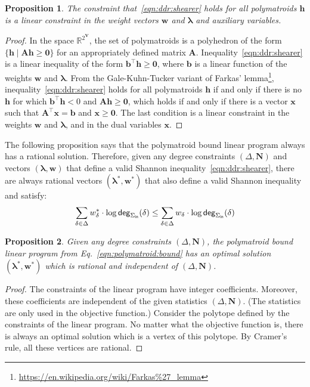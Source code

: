 \documentclass[10pt,a4paper]{article}
\newtheorem{proposition}{Proposition}[section]
\newcommand{\degree}{\text{\sf deg}}
\newcommand{\R}{\mathbb R} %
\newcommand{\inn}{\text{\sf in}}
\begin{document}
\begin{proposition}
The constraint that~\eqref{eqn:ddr:shearer} holds for all polymatroids $\bm h$ is a linear constraint in the
weight vectors $\bm w$ and $\bm \lambda$ and auxiliary variables.
\end{proposition}
\begin{proof}
  In the space $\R^{2^{\bm V}}$, the set of polymatroids is a polyhedron of the form
  $\{ \bm h \mid \bm A \bm h \geq \bm 0 \}$ for an appropriately defined matrix $\bm A$.
  Inequality~\eqref{eqn:ddr:shearer} is a linear inequality of the form
  $\bm b^\top \bm h \geq \bm 0$, where $\bm b$ is a linear function of the weights $\bm w$ and $\bm \lambda$.
  From the Gale-Kuhn-Tucker variant of Farkas' lemma\footnote{\url{https://en.wikipedia.org/wiki/Farkas\%27_lemma}},
  inequality~\eqref{eqn:ddr:shearer} holds for all polymatroids $\bm h$ if and only if
  there is no $\bm h$ for which $\bm b^\top \bm h < 0$ and $\bm A\bm h \geq \bm 0$,
  which holds if and only if there is a vector $\bm x$ such that
  $\bm A^\top \bm x = \bm b$ and $\bm x \geq \bm 0$.
  The last condition is a linear constraint in the weights $\bm w$ and $\bm \lambda$, and
  in the dual variables $\bm x$.
\end{proof}

    The following proposition says that the polymatroid bound linear program always has a rational solution.
    Therefore, given any degree constraints $(\Delta, \bm N)$ and vectors $(\bm\lambda,\bm w)$ that define a valid Shannon inequality~\eqref{eqn:ddr:shearer},
    there are always rational vectors $(\bm\lambda^*,\bm w^*)$ that also define a valid Shannon inequality and satisfy:
    \begin{align*}
        \sum_{\delta\in\Delta}w^*_\delta\cdot \log \degree_{\Sigma_\inn}(\delta) \leq
        \sum_{\delta\in\Delta}w_\delta\cdot \log \degree_{\Sigma_\inn}(\delta)
    \end{align*}
    \begin{proposition}
        Given any degree constraints $(\Delta, \bm N)$, the polymatroid bound linear program from Eq.~\eqref{eqn:polymatroid:bound} has an optimal solution $(\bm\lambda^*,\bm w^*)$ which is rational and independent of $(\Delta, \bm N)$.
        \label{prop:rational:shannon}
    \end{proposition}
    \begin{proof}
        The constraints of the linear program have integer coefficients.
        Moreover, these coefficients are independent of the given statistics $(\Delta, \bm N)$.
        (The statistics are only used in the objective function.)
        Consider the polytope defined by the constraints of the linear program.
        No matter what the objective function is, there is always an optimal solution which is a vertex of this polytope. By Cramer's rule, all these vertices are rational.
    \end{proof}
\end{document}

